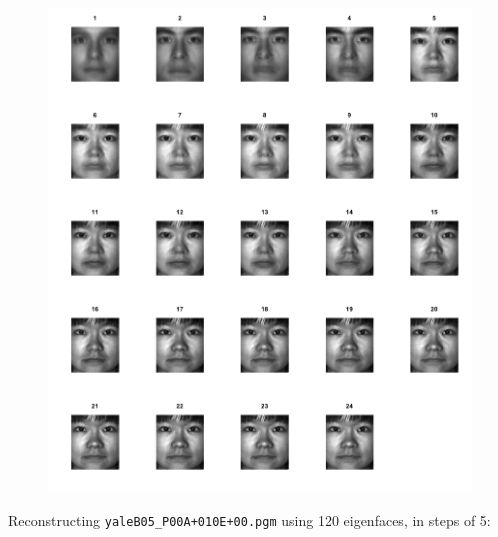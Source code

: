 \documentclass[11pt]{exam} %
\begin{document}
\begin{questions}
\begin{parts}
\begin{figure}[H]
	\centering
	\includegraphics[width=6in]{2e_faces24.png}
\end{figure}

Reconstructing \texttt{yaleB05\_P00A+010E+00.pgm} using 120 eigenfaces, in steps of 5:


\end{parts}
\end{questions}
\end{document}
